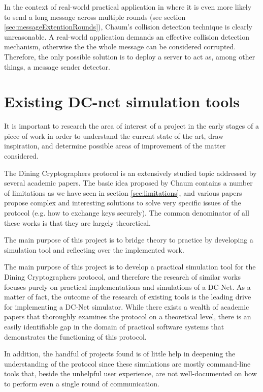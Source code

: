 In the context of real-world practical application in where it is even more likely to send a long message across multiple rounds (see section \ref{sec:messageExtentionRounds}), Chaum's collision detection technique is clearly unreasonable. 
A real-world application demands an effective collision detection mechanism, otherwise the the whole message can be considered corrupted. Therefore, the only possible solution is to deploy a server to act as, among other things, a message sender detector.


\section{Existing DC-net simulation tools} \label{sec:similarWorks}
It is important to research the area of interest of a project in the early stages of a piece of work in order to understand the current state of the art, draw inspiration, and determine possible areas of improvement of the matter considered.

The Dining Cryptographers protocol is an extensively studied topic addressed by several academic papers. The basic idea proposed by Chaum contains a number of limitations as we have seen in section \ref{sec:limitations}, and various papers propose complex and interesting solutions to solve very specific issues of the protocol (e.g. how to exchange keys securely). The common denominator of all these works is that they are largely theoretical. 


The main purpose of this project is to bridge theory to practice by developing a simulation tool and reflecting over the implemented work.

The main purpose of this project is to develop a practical simulation tool for the Dining Cryptographers protocol, and therefore the research of similar works focuses purely on practical implementations and simulations of a DC-Net. As a matter of fact, the outcome of the research of existing tools is the leading drive for implementing a DC-Net simulator. While there exists a wealth of academic papers that thoroughly examines the protocol on a theoretical level, there is an easily identifiable gap in the domain of practical software systems that demonstrates the functioning of this protocol.

In addition, the handful of projects found is of little help in deepening the understanding of the protocol since these simulations are mostly command-line tools that, beside the unhelpful user experience, are not well-documented on how to perform even a single round of communication. \newline

